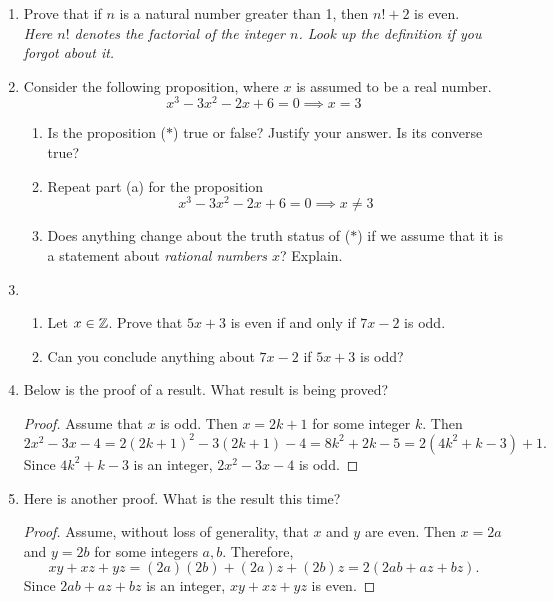 \begin{exercises}{}{}
\begin{enumerate}
	\item Prove that if $n$ is a natural number greater than 1, then $n!+2$ is even.\\[5pt]
  \emph{Here $n!$ denotes the \emph{factorial} of the integer $n$. Look up the definition if you forgot about it.}
  
  \item Consider the following proposition, where $x$ is assumed to be a real number.
	\[x^3-3x^2-2x+6=0\implies x=3\tag*{($\ast$)}\]
	\begin{enumerate}
  	\item Is the proposition ($\ast$) true or false? Justify your answer. Is its converse true?
  	\item Repeat part (a) for the proposition
		\[x^3-3x^2-2x+6=0\implies x\neq 3\]
  	\item Does anything change about the truth status of ($\ast$) if we assume that it is a statement about \emph{rational numbers $x$}? Explain.
	\end{enumerate}
  
	\item\begin{enumerate}
	  \item Let $x\in\mathbb{Z}$. Prove that $5x+3$ is even if and only if $7x-2$ is odd.
	  \item Can you conclude anything about $7x-2$ if $5x+3$ is odd?
	  \end{enumerate}
	  
	  
	\item Below is the proof of a result. What result is being proved?
  \begin{proof}
  Assume that $x$ is odd. Then $x=2k+1$ for some integer $k$. Then
  \[2x^2-3x-4=2(2k+1)^2-3(2k+1)-4=8k^2+2k-5=2(4k^2+k-3)+1.\]
  Since $4k^2+k-3$ is an integer, $2x^2-3x-4$ is odd.
  \end{proof}
 
	
	\item Here is another proof. What is the result this time?
  \begin{proof}
  Assume, without loss of generality, that $x$ and $y$ are even. Then $x=2a$ and $y=2b$ for some integers $a,b$. Therefore,
  \[xy+xz+yz=(2a)(2b)+(2a)z+(2b)z=2(2ab+az+bz).\]
  Since $2ab+az+bz$ is an integer, $xy+xz+yz$ is even.
  \end{proof}
	  

\end{enumerate}
\end{exercises}
